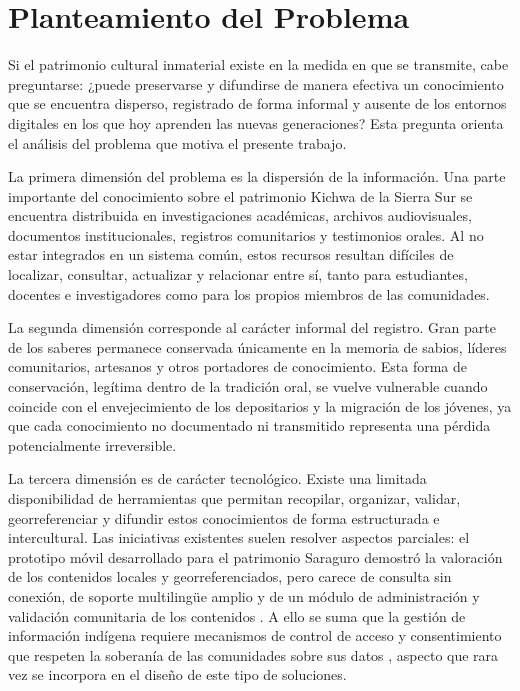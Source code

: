 \section{Planteamiento del Problema}
Si el patrimonio cultural inmaterial existe en la medida en que se transmite, cabe preguntarse: ¿puede preservarse y difundirse de manera efectiva un conocimiento que se encuentra disperso, registrado de forma informal y ausente de los entornos digitales en los que hoy aprenden las nuevas generaciones? Esta pregunta orienta el análisis del problema que motiva el presente trabajo.

La primera dimensión del problema es la dispersión de la información. Una parte importante del conocimiento sobre el patrimonio Kichwa de la Sierra Sur se encuentra distribuida en investigaciones académicas, archivos audiovisuales, documentos institucionales, registros comunitarios y testimonios orales. Al no estar integrados en un sistema común, estos recursos resultan difíciles de localizar, consultar, actualizar y relacionar entre sí, tanto para estudiantes, docentes e investigadores como para los propios miembros de las comunidades.

La segunda dimensión corresponde al carácter informal del registro. Gran parte de los saberes permanece conservada únicamente en la memoria de sabios, líderes comunitarios, artesanos y otros portadores de conocimiento. Esta forma de conservación, legítima dentro de la tradición oral, se vuelve vulnerable cuando coincide con el envejecimiento de los depositarios y la migración de los jóvenes, ya que cada conocimiento no documentado ni transmitido representa una pérdida potencialmente irreversible.

La tercera dimensión es de carácter tecnológico. Existe una limitada disponibilidad de herramientas que permitan recopilar, organizar, validar, georreferenciar y difundir estos conocimientos de forma estructurada e intercultural. Las iniciativas existentes suelen resolver aspectos parciales: el prototipo móvil desarrollado para el patrimonio Saraguro demostró la valoración de los contenidos locales y georreferenciados, pero carece de consulta sin conexión, de soporte multilingüe amplio y de un módulo de administración y validación comunitaria de los contenidos \cite{quezada2026mobile}. A ello se suma que la gestión de información indígena requiere mecanismos de control de acceso y consentimiento que respeten la soberanía de las comunidades sobre sus datos \cite{kukutai2016indigenous,hudson2023indigenous}, aspecto que rara vez se incorpora en el diseño de este tipo de soluciones.

